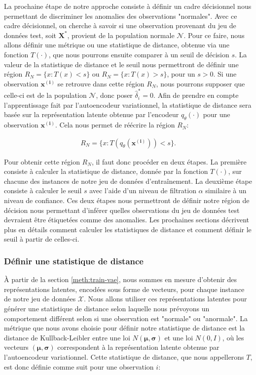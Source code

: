 La prochaine étape de notre approche consiste à définir un cadre décisionnel nous permettant de discriminer les anomalies des observations "normales". Avec ce cadre décisionnel, on cherche à savoir si une observation provenant du jeu de données test, soit $\boldsymbol{X}^{*}$, provient de la population normale $\mathcal{N}$. Pour ce faire, nous allons définir une métrique ou une statistique de distance, obtenue via une fonction $T(\cdot)$, que nous pourrons ensuite comparer à un seuil de décision $s$. La valeur de la statistique de distance et le seuil nous permettront de définir une région $R_{N}=\{x :T(x)<s\}$ ou $R_{N}=\{x :T(x)>s\}$, pour un $s>0$. Si une observation $\boldsymbol{x^{(i)}}$ se retrouve dans cette région $R_{N}$, nous pourrons supposer que celle-ci est de la population $\mathcal{N}$, donc poser $\hat{\delta}^{*}_{i}=0$. Afin de prendre en compte l'apprentissage fait par l'autoencodeur variationnel, la statistique de distance sera basée sur la représentation latente obtenue par l'encodeur $q_\theta(\cdot)$ pour une observation $\boldsymbol{x^{(i)}}$. Cela nous permet de réécrire la région $R_N$:

\begin{gather}  \label{eq:region}
R_{N}=\{x :T(q_\theta(\boldsymbol{x^{(i)}}))<s\}.
\end{gather}

Pour obtenir cette région $R_N$, il faut donc procéder en deux étapes. La première consiste à calculer la statistique de distance, donnée par la fonction $T(\cdot)$, sur chacune des instances de notre jeu de données d'entraînement. La deuxième étape consiste à calculer le seuil $s$ avec l'aide d'un niveau de filtration $\alpha$ similaire à un niveau de confiance. Ces deux étapes nous permettront de définir notre région de décision nous permettant d'inférer quelles observations du jeu de données test devraient être étiquetées comme des anomalies. Les prochaines sections décrivent plus en détails comment calculer les statistiques de distance et comment définir le seuil à partir de celles-ci.

\subsubsection{Définir une statistique de distance}

 À partir de la section \ref{meth:train-vae}, nous sommes en mesure d'obtenir des représentations latentes, encodées sous forme de vecteurs, pour chaque instance de notre jeu de données $\mathcal{X}$. Nous allons utiliser ces représentations latentes pour générer une statistique de distance selon laquelle nous prévoyons un comportement différent selon si une observation est "normale" ou "anormale". La métrique que nous avons choisie pour définir notre statistique de distance est la distance de Kullback-Leibler entre une loi $N(\boldsymbol{\mu}, \boldsymbol{\sigma})$ et une loi $N(0,I)$, où les vecteurs $(\boldsymbol{\mu}, \boldsymbol{\sigma})$ correspondent à la représentation latente obtenue par l'autoencodeur variationnel. Cette statistique de distance, que nous appellerons $T$, est donc définie comme suit pour une observation $i$:
 

